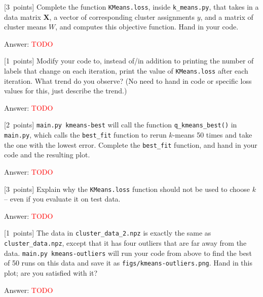 \documentclass{article}
\newcommand{\ask}[1]{\textcolor{question}{#1}}
\newenvironment{answer}{\par\begingroup\color{answer}Answer: }{\endgroup}
\newcommand{\red}[1]{\textcolor{red}{#1}}
\newcommand{\pts}[1]{\textcolor{points}{[#1~points]}}
\newcommand{\TODO}{\red{TODO}}
\newcommand{\bX}{\mathbf{X}}
\begin{document}
\begin{qlist}
 \item \pts{3} Complete the function \texttt{KMeans.loss}, inside \texttt{k\_means.py}, that takes in a data matrix $\bX$, a vector of corresponding cluster assignments $y$, and a matrix of cluster means $W$, and computes this objective function. \ask{Hand in your code.}
\begin{answer}\TODO\end{answer}


 \item \pts{1} Modify your code to, instead of/in addition to printing the number of labels that change on each iteration, print the value of \texttt{KMeans.loss} after each iteration. \ask{What trend do you observe?} (No need to hand in code or specific loss values for this, just describe the trend.)
\begin{answer}\TODO\end{answer}

 \item \pts{2} \texttt{main.py kmeans-best} will call the function \verb|q_kmeans_best()| in \texttt{main.py}, which calls the \verb|best_fit| function to rerun $k$-means 50 times and take the one with the lowest error. Complete the \verb|best_fit| function, and \ask{hand in your code and the resulting plot}.
\begin{answer}\TODO\end{answer}

 \item \pts{3} \ask{Explain why} the \texttt{KMeans.loss} function should not be used to choose $k$ -- even if you evaluate it on test data.
\begin{answer}\TODO\end{answer}


 \item \pts{1} The data in \texttt{cluster\_data\_2.npz} is exactly the same as \texttt{cluster\_data.npz}, except that it has four outliers that are far away from the data. \texttt{main.py kmeans-outliers} will run your code from above to find the best of 50 runs on this data and save it as \texttt{figs/kmeans-outliers.png}. \ask{Hand in this plot; are you satisfied with it?}
 \begin{answer}\TODO\end{answer}


\end{qlist}
\end{document}
